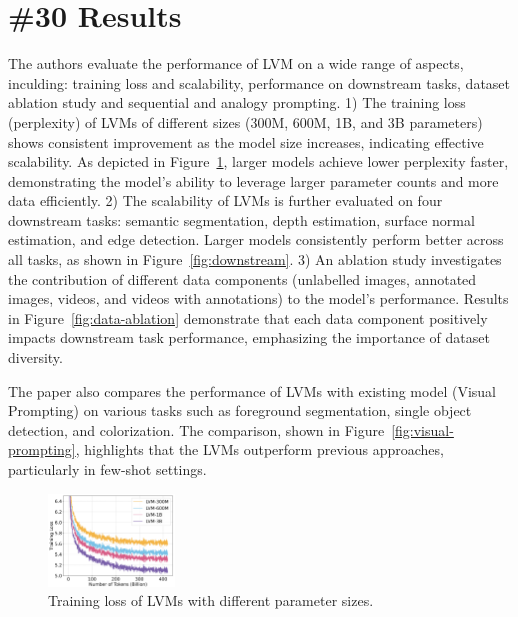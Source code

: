 \documentclass[conference]{IEEEtran}
\theoremstyle{definition}
\theoremstyle{plain}
\theoremstyle{remark}
\begin{document}
\section{\textbf{\#30} Results}
The authors evaluate the performance of LVM on a wide range of aspects, inculding: training loss and scalability, performance on downstream tasks, dataset ablation study and sequential and analogy prompting. 
1) The training loss (perplexity) of LVMs of different sizes (300M, 600M, 1B, and 3B parameters) shows consistent improvement as the model size increases, indicating effective scalability. As depicted in Figure~\ref{fig:training-loss}, larger models achieve lower perplexity faster, demonstrating the model's ability to leverage larger parameter counts and more data efficiently.
2) The scalability of LVMs is further evaluated on four downstream tasks: semantic segmentation, depth estimation, surface normal estimation, and edge detection. Larger models consistently perform better across all tasks, as shown in Figure~\ref{fig:downstream}.
3) An ablation study investigates the contribution of different data components (unlabelled images, annotated images, videos, and videos with annotations) to the model's performance. Results in Figure~\ref{fig:data-ablation} demonstrate that each data component positively impacts downstream task performance, emphasizing the importance of dataset diversity.

The paper also compares the performance of LVMs with existing model (Visual Prompting) on various tasks such as foreground segmentation, single object detection, and colorization. The comparison, shown in Figure~\ref{fig:visual-prompting}, highlights that the LVMs outperform previous approaches, particularly in few-shot settings.

\begin{figure}[!htbp]
    \centering
    \includegraphics[width=0.3\textwidth]{training-loss.png}
    \caption{Training loss of LVMs with different parameter sizes.}
    \label{fig:training-loss}
\end{figure}
\end{document}
